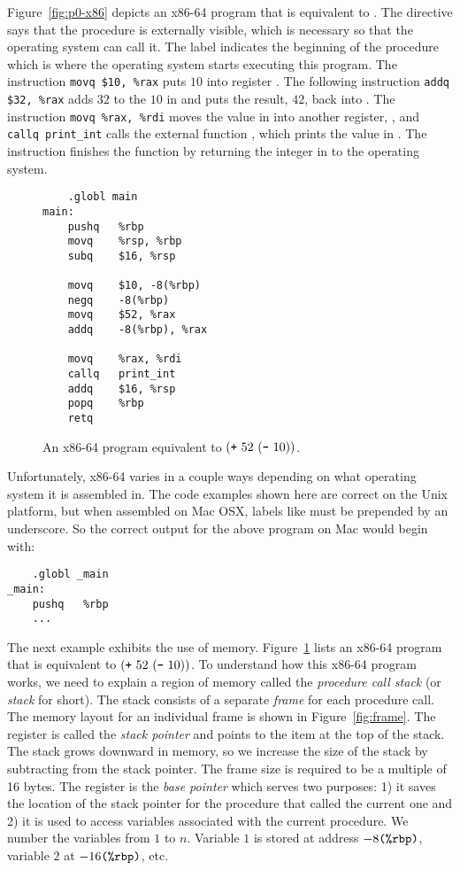 \documentclass[11pt]{book}
\begin{document}
Figure~\ref{fig:p0-x86} depicts an x86-64 program that is equivalent
to . The  directive says that the
 procedure is externally visible, which is necessary so
that the operating system can call it. The label 
indicates the beginning of the  procedure which is where
the operating system starts executing this program.  The instruction
\lstinline{movq $10, %rax} puts $10$ into register . The
following instruction \lstinline{addq $32, %rax} adds $32$ to the
$10$ in  and puts the result, $42$, back into
. The instruction \lstinline{movq %rax, %rdi} moves the value 
in  into another register, , and 
\lstinline{callq print_int} calls the external function , which
prints the value in .
The instruction  finishes the 
function by returning the integer in  to the
operating system.


\begin{wrapfigure}{r}{2.25in}
\begin{lstlisting}
	.globl main
main:
	pushq	%rbp
	movq	%rsp, %rbp
	subq	$16, %rsp

	movq	$10, -8(%rbp)
	negq	-8(%rbp)
	movq	$52, %rax
	addq	-8(%rbp), %rax
	
	movq	%rax, %rdi
	callq	print_int
	addq	$16, %rsp
	popq	%rbp
	retq
\end{lstlisting}
\caption{An x86-64 program equivalent to $(\texttt{+}~52~(\texttt{-}~10) )$.}
\label{fig:p1-x86}
\end{wrapfigure}

Unfortunately, x86-64 varies in a couple ways depending on what
operating system it is assembled in. The code examples shown here are
correct on the Unix platform, but when assembled on Mac OSX, labels
like  must be prepended by an underscore.  So the correct
output for the above program on Mac would begin with:

\begin{lstlisting}
	.globl _main
_main:
	pushq	%rbp
	...
\end{lstlisting}


The next example exhibits the use of memory.  Figure~\ref{fig:p1-x86}
lists an x86-64 program that is equivalent to $(\texttt{+}~52~
  (\texttt{-}~10) )$. To understand how this x86-64 program works, we
need to explain a region of memory called the \emph{procedure call
  stack} (or \emph{stack} for short). The stack consists of a separate
\emph{frame} for each procedure call. The memory layout for an
individual frame is shown in Figure~\ref{fig:frame}.  The register
 is called the \emph{stack pointer} and points to the item at
the top of the stack. The stack grows downward in memory, so we
increase the size of the stack by subtracting from the stack
pointer. The frame size is required to be a multiple of 16 bytes. The
register  is the \emph{base pointer} which serves two
purposes: 1) it saves the location of the stack pointer for the
procedure that called the current one and 2) it is used to access
variables associated with the current procedure. We number the
variables from $1$ to $n$. Variable $1$ is stored at address
$-8\texttt{(\%rbp)}$, variable $2$ at $-16\texttt{(\%rbp)}$, etc.
\end{document}
